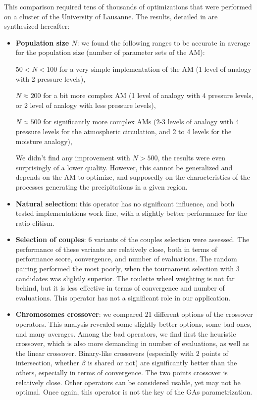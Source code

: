 \documentclass[twocol]{ametsoc}
\begin{document}
This comparison required tens of thousands of optimizations that were performed on a cluster of the University of Lausanne. The results, detailed in \citet{Horton2012a} are synthesized hereafter:

\begin{itemize}
	\item \textbf{Population size $N$}: we found the following ranges to be accurate in average for the population size (number of parameter sets of the AM):
	
	$50<N<100$ for a very simple implementation of the AM (1 level of analogy with 2 pressure levels),
	
	$N\approx200$ for a bit more complex AM (1 level of analogy with 4 pressure levels, or 2 level of analogy with less pressure levels),
	
	$N\approx500$ for significantly more complex AMs (2-3 levels of analogy with 4 pressure levels for the atmospheric circulation, and 2 to 4 levels for the moisture analogy),
	
	We didn't find any improvement with $N>500$, the results were even surprisingly of a lower quality. However, this cannot be generalized and depends on the AM to optimize, and supposedly on the characteristics of the processes generating the precipitations in a given region. 
	
	\item \textbf{Natural selection}: this operator has no significant influence, and both tested implementations work fine, with a slightly better performance for the ratio-elitism.
	
	\item \textbf{Selection of couples}: 6 variants of the couples selection were assessed. The performance of these variants are relatively close, both in terms of performance score, convergence, and number of evaluations. The random pairing performed the most poorly, when the tournament selection with 3 candidates was slightly superior. The roulette wheel weighting is not far behind, but it is less effective in terms of convergence and number of evaluations. This operator has not a significant role in our application. 
	
	\item \textbf{Chromosomes crossover}: we compared 21 different options of the crossover operators. This analysis revealed some slightly better options, some bad ones, and many averages. Among the bad operators, we find first the heuristic crossover, which is also more demanding in number of evaluations, as well as the linear crossover. Binary-like crossovers (especially with 2 points of intersection, whether $\beta$ is shared or not) are significantly better than the others, especially in terms of convergence. The two points crossover is relatively close. Other operators can be considered usable, yet may not be optimal. Once again, this operator is not the key of the GAs parametrization.
	

\end{itemize}
\end{document}
